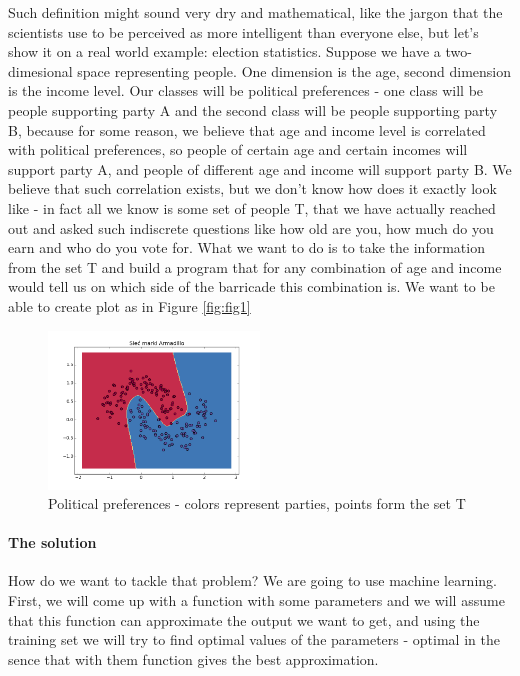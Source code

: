 \documentclass[3p,twocolumn]{elsarticle}
\begin{document}
Such definition might sound very dry and mathematical, like the jargon that the scientists use to be perceived as more intelligent than everyone else, but let's show it on a real world example: election statistics. Suppose we have a two-dimesional space representing people. One dimension is the age, second dimension is the income level. Our classes will be political preferences - one class will be people supporting party A and the second class will be people supporting party B, because for some reason, we believe that age and income level is correlated with political preferences, so people of certain age and certain incomes will support party A, and people of different age and income will support party B. We believe that such correlation exists, but we don't know how does it exactly look like - in fact all we know is some set of people T, that we have actually reached out and asked such indiscrete questions like how old are you, how much do you earn and who do you vote for. What we want to do is to take the information from the set T and build a program that for any combination of age and income would tell us on which side of the barricade this combination is. We want to be able to create plot as in Figure \ref{fig:fig1}

\begin{figure}[fig1]
	
\label{fig:fig1}
  \includegraphics[width=0.50\textwidth]{figure_1.png}
	\caption{Political preferences - colors represent parties, points form the set T}
	\label{fig1}
\end{figure}


\paragraph{The solution}

How do we want to tackle that problem? We are going to use machine learning. First, we will come up with a function with some parameters and we will assume that this function can approximate the output we want to get, and using the training set we will try to find optimal values of the parameters - optimal in the sence that with them function gives the best approximation.
\end{document}
